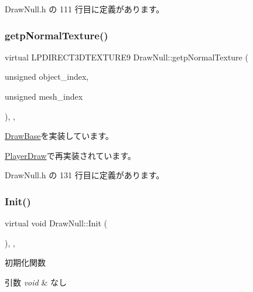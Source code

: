  Draw\+Null.\+h の 111 行目に定義があります。

\mbox{\label{class_draw_null_a3b51dfd629853a461cc50175de94ee03}} 
\subsubsection{\texorpdfstring{getp\+Normal\+Texture()}{getpNormalTexture()}}
{\footnotesize\ttfamily virtual L\+P\+D\+I\+R\+E\+C\+T3\+D\+T\+E\+X\+T\+U\+R\+E9 Draw\+Null\+::getp\+Normal\+Texture (\begin{DoxyParamCaption}\item[{unsigned}]{object\+\_\+index,  }\item[{unsigned}]{mesh\+\_\+index }\end{DoxyParamCaption})\hspace{0.3cm}{\ttfamily [inline]}, {\ttfamily [override]}, {\ttfamily [virtual]}}



\mbox{\hyperlink{class_draw_base_a76c3b910b495fcf69aacf6164ca90c7d}{Draw\+Base}}を実装しています。



\mbox{\hyperlink{class_player_draw_a231aa618a0bf71311b61897ccf7191b8}{Player\+Draw}}で再実装されています。



 Draw\+Null.\+h の 131 行目に定義があります。

\mbox{\label{class_draw_null_acd7fef3ccea1da537ac9507ffbb6dd2e}} 
\subsubsection{\texorpdfstring{Init()}{Init()}}
{\footnotesize\ttfamily virtual void Draw\+Null\+::\+Init (\begin{DoxyParamCaption}{ }\end{DoxyParamCaption})\hspace{0.3cm}{\ttfamily [inline]}, {\ttfamily [override]}, {\ttfamily [virtual]}}



初期化関数 


\begin{DoxyParams}{引数}
{\em void} & なし \\
\hline
\end{DoxyParams}

